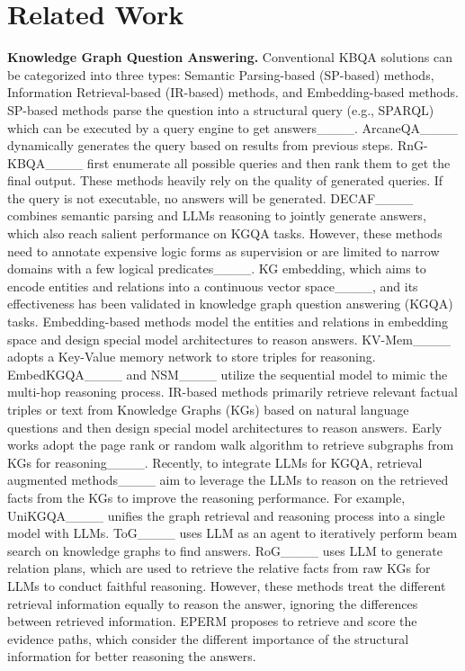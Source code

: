 \section{Related Work}
\textbf{Knowledge Graph Question Answering.}
Conventional KBQA solutions can be categorized into three types: Semantic Parsing-based (SP-based) methods, Information Retrieval-based (IR-based) methods, and Embedding-based methods. SP-based methods parse the question into a structural query (e.g., SPARQL) which can be executed by a query engine to get answers____. ArcaneQA____ dynamically generates the query based on results from previous steps. RnG-KBQA____ first enumerate all possible queries and then rank them to get the final output. These methods heavily rely on the quality of generated queries. If the query is not executable, no answers will be generated. DECAF____ combines semantic parsing and LLMs reasoning to jointly generate answers, which also reach salient performance on KGQA tasks. However, these methods need to annotate expensive logic forms as supervision or are limited to narrow domains with a few logical predicates____. KG embedding, which aims to encode entities and relations into a continuous vector space____, and its effectiveness has been validated in knowledge graph question answering (KGQA) tasks. Embedding-based methods model the entities and relations in embedding space and design special model architectures to reason answers. KV-Mem____ adopts a Key-Value memory network to store triples for reasoning. EmbedKGQA____ and NSM____ utilize the sequential model to mimic the multi-hop reasoning process. IR-based methods primarily retrieve relevant factual triples or text from Knowledge Graphs (KGs) based on natural language questions and then design special model architectures to reason answers. Early works adopt the page rank or random walk algorithm to retrieve subgraphs from KGs for reasoning____. Recently, to integrate LLMs for KGQA, retrieval augmented methods____ aim to leverage the LLMs to reason on the retrieved facts from the KGs to improve the reasoning performance. For example, UniKGQA____ unifies the graph retrieval and reasoning process into a single model with LLMs. ToG____ uses LLM as an agent to iteratively perform beam search on knowledge graphs to find answers. RoG____ uses LLM to generate relation plans, which are used to retrieve the relative facts from raw KGs for LLMs to conduct faithful reasoning. However, these methods treat the different retrieval information equally to reason the answer, ignoring the differences between retrieved information. EPERM proposes to retrieve and score the evidence paths, which consider the different importance of the structural information for better reasoning the answers. 

